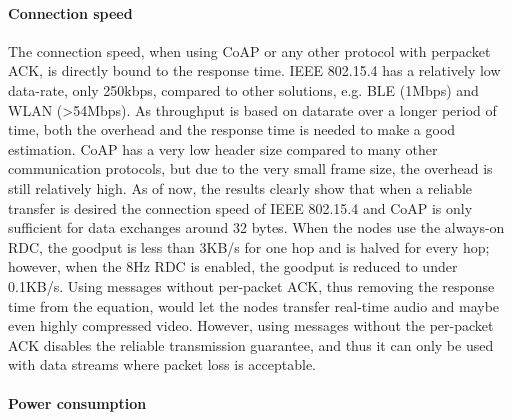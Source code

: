 \paragraph{Connection speed}

The connection speed,
	when using CoAP or any other protocol with perpacket ACK,
	is directly bound to the response time.
IEEE 802.15.4 has a relatively low data-rate,
	only 250kbps,
	compared to other solutions,
	e.g.
BLE (1Mbps) and WLAN (>54Mbps).
As throughput is based on datarate over a longer period of time,
	both the overhead and the response time is needed to make a good estimation.
CoAP has a very low header size compared to many other communication protocols,
	but due to the very small frame size,
	the overhead is still relatively high.
As of now,
	the results clearly show that when a reliable transfer is desired the connection speed of IEEE 802.15.4 and CoAP is only sufficient for data exchanges around 32 bytes.
When the nodes use the always-on RDC,
	the goodput is less than 3KB/s for one hop and is halved for every hop;
	however,
	when the 8Hz RDC is enabled,
	the goodput is reduced to under 0.1KB/s.
Using messages without per-packet ACK,
	thus removing the response time from the equation,
	would let the nodes transfer real-time audio and maybe even highly compressed video.
However,
	using messages without the per-packet ACK disables the reliable transmission guarantee,
	and thus it can only be used with data streams where packet loss is acceptable.


\paragraph{Power consumption}

